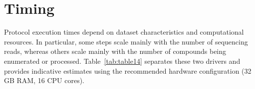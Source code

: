 \section{Timing}
\label{sec:timing}
Protocol execution times depend on dataset characteristics and computational resources. In particular, some steps scale mainly with the number of sequencing reads, whereas others scale mainly with the number of compounds being enumerated or processed. Table~\ref{tab:table14} separates these two drivers and provides indicative estimates using the recommended hardware configuration (32 GB RAM, 16 CPU cores).


